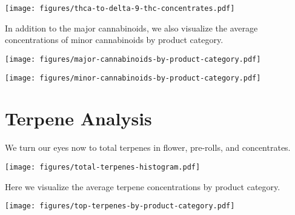 \documentclass[../article.tex, 12pt]{subfiles}
\begin{document}
\begin{center}
\texttt{[image: figures/thca-to-delta-9-thc-concentrates.pdf]}
\end{center}


\newpage

In addition to the major cannabinoids, we also visualize the average concentrations of minor cannabinoids by product category.

\vspace{2\baselineskip}

\begin{center}
\texttt{[image: figures/major-cannabinoids-by-product-category.pdf]}
\end{center}

\vspace{2\baselineskip}

\begin{center}
\texttt{[image: figures/minor-cannabinoids-by-product-category.pdf]}
\end{center}


\newpage
\section*{Terpene Analysis}
\label{sec:Terpene Analysis}

We turn our eyes now to total terpenes in flower, pre-rolls, and concentrates.

\vspace{1\baselineskip}

\begin{center}
\texttt{[image: figures/total-terpenes-histogram.pdf]}
\end{center}

\vspace{1\baselineskip}

Here we visualize the average terpene concentrations by product category.

\vspace{2\baselineskip}

\begin{center}
\texttt{[image: figures/top-terpenes-by-product-category.pdf]}
\end{center}
\end{document}
